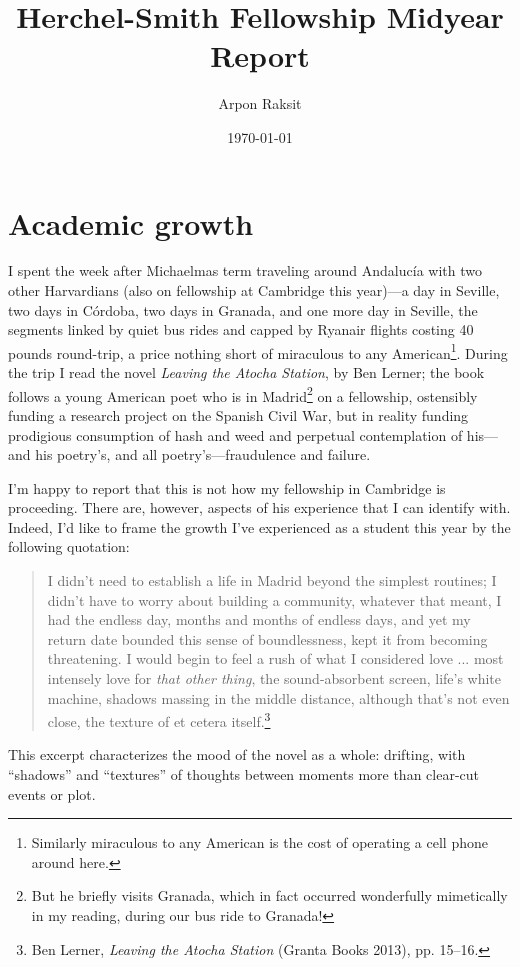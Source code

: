 


\title{Herchel-Smith Fellowship Midyear Report}
\author{Arpon Raksit}
\date{\today}



\maketitle


\section*{Academic growth}

I spent the week after Michaelmas term traveling around Andaluc\'{i}a with two other Harvardians (also on fellowship at Cambridge this year)---a day in Seville, two days in C\'{o}rdoba, two days in Granada, and one more day in Seville, the segments linked by quiet bus rides and capped by Ryanair flights costing 40 pounds round-trip, a price nothing short of miraculous to any American\footnote{Similarly miraculous to any American is the cost of operating a cell phone around here.}. During the trip I read the novel \emph{Leaving the Atocha Station}, by Ben Lerner; the book follows a young American poet who is in Madrid\footnote{But he briefly visits Granada, which in fact occurred wonderfully mimetically in my reading, during our bus ride to Granada!} on a fellowship, ostensibly funding a research project on the Spanish Civil War, but in reality funding prodigious consumption of hash and weed and perpetual contemplation of his---and his poetry's, and all poetry's---fraudulence and failure.

I'm happy to report that this is not how my fellowship in Cambridge is proceeding. There are, however, aspects of his experience that I can identify with. Indeed, I'd like to frame the growth I've experienced as a student this year by the following quotation:
\begin{quote}
  I didn't need to establish a life in Madrid beyond the simplest routines; I didn't have to worry about building a community, whatever that meant, I had the endless day, months and months of endless days, and yet my return date bounded this sense of boundlessness, kept it from becoming threatening. I would begin to feel a rush of what I considered love ... most intensely love for \emph{that other thing}, the sound-absorbent screen, life's white machine, shadows massing in the middle distance, although that's not even close, the texture of et cetera itself.\footnote{Ben Lerner, \emph{Leaving the Atocha Station} (Granta Books 2013), pp. 15--16.}
\end{quote}
This excerpt characterizes the mood of the novel as a whole: drifting, with ``shadows'' and ``textures'' of thoughts between moments more than clear-cut events or plot.

